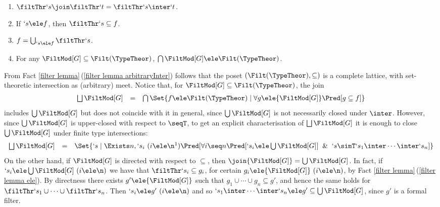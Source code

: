\documentclass{lmcs}
\begin{document}
 \begin{fact} \label{filter lemma}
 \begin{enumerate}

 \firstitem \label{filter lemma leq} 
$`s\seqT `t$ if and only if $\filtThr`t \subseteq \filtThr`s$.

 \item \label{filter lemma join-meet} 
 $\filtThr `s \join \filtThr`t = \filtThr`s\inter`t$.

 \item \label{filter lemma ele} 
If $`s \ele f$, then $\filtThr `s \subseteq f$.

 \item \label{filter lemma filtersup}
$f = \bigcup_{`s \ele f} \filtThr `s $.

 \item \label{filter lemma arbitraryInter}
For any ${\FiltMod[G]}\subseteq \Filt(\TypeTheor)$, $\bigcap{\FiltMod[G]} \ele \Filt(\TypeTheor)$.

 \end{enumerate}
 \end{fact}

From Fact \ref{filter lemma}\,(\ref{filter lemma arbitraryInter}) follows that the poset $(\Filt(\TypeTheor),\subseteq)$ is a complete lattice, with set-theoretic intersection as (arbitrary) meet. 
Notice that, for ${\FiltMod[G]}\subseteq \Filt(\TypeTheor)$, the join 
%
 \[ \begin{array}{rcl}
\bigsqcup {\FiltMod[G]} &=& \bigcap \Set{f \ele \Filt(\TypeTheor) \mid \forall g \ele {\FiltMod[G]} \Pred[ g \subseteq f] }
 \end{array} \]
includes $\bigcup {\FiltMod[G]}$ but does not coincide with it in general, since $\bigcup {\FiltMod[G]}$ is not necessarily closed under $\inter$. 
However, since $\bigcup {\FiltMod[G]}$ is upper-closed with respect to $\seqT$, to get an explicit characterisation of $\bigsqcup {\FiltMod[G]}$ it is enough to close $\bigcup {\FiltMod[G]}$ under finite type intersections:
%
 \[ \begin{array}{rcl}
\bigsqcup {\FiltMod[G]} &=&
 \Set{`s \mid \Exists n, `s_i ~ (i \ele \n\footnotemark) \Pred[{ \forall i \seq n \Pred[`s_i \ele \bigcup{\FiltMod[G]} ] \And `s \simT `s_1\inter\cdots\inter`s_n }] } 
 \end{array} \] 
%
On the other hand, if ${\FiltMod[G]}$ is directed with respect to $\subseteq$, then $\join{\FiltMod[G]} =\bigcup {\FiltMod[G]}$. 
In fact, if $`s_i \ele \bigcup{\FiltMod[G]} ~ (i \ele \n)$ we have that
$\filtThr `s_i \subseteq g_i$, for certain $g_i\ele {\FiltMod[G]} ~ (i \ele \n) $, by Fact \ref{filter lemma}\,(\ref{filter lemma ele}). 
By directness there exists $g' \ele {\FiltMod[G]}$ such that $g_1 \cup \cdots \cup g_n \subseteq g'$, and hence the same holds for $\filtThr `s_1 \cup \cdots \cup \filtThr `s_n$. 
Then $`s_i \ele g' ~ (i \ele \n)$ and so $`s_1\inter\cdots\inter`s_n \ele g' \subseteq \bigcup {\FiltMod[G]}$, since $g'$ is a formal filter.
\end{document}
